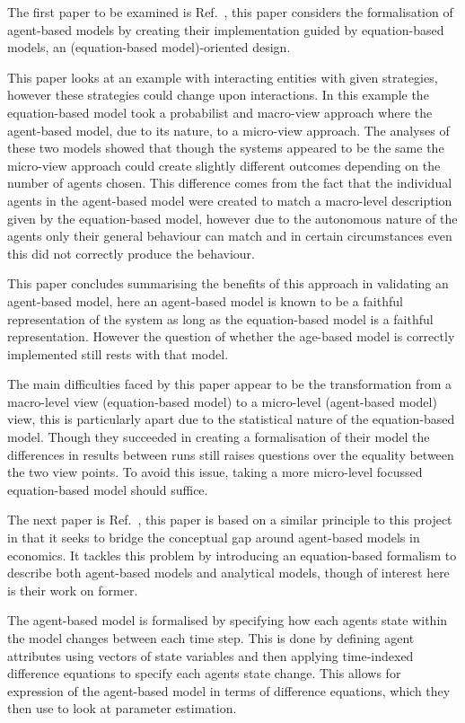 \documentclass{article}
\begin{document}
The first paper to be examined is Ref.~\cite{ebmabmi}, this paper considers the formalisation of agent-based models by creating their implementation guided by equation-based models, an (equation-based model)-oriented design.  

This paper looks at an example with interacting entities with given strategies, however these strategies could change upon interactions. In this example the equation-based model took a probabilist and macro-view approach where the agent-based model, due to its nature, to a micro-view approach. The analyses of these two models showed that though the systems appeared to be the same the micro-view approach could create slightly different outcomes depending on the number of agents chosen. This difference comes from the fact that the individual agents in the agent-based model were created to match a macro-level description given by the equation-based model, however due to the autonomous nature of the agents only their general behaviour can match and in certain circumstances even this did not correctly produce the behaviour.

This paper concludes summarising the benefits of this approach in validating an agent-based model, here an agent-based model is known to be a faithful representation of the system as long as the equation-based model is a faithful representation. However the question of whether the age-based model is correctly implemented still rests with that model. 

The main difficulties faced by this paper appear to be the transformation from a macro-level view (equation-based model) to a micro-level (agent-based model) view, this is particularly apart due to the statistical nature of the equation-based model. Though they succeeded in creating a formalisation of their model the differences in results between runs still raises questions over the equality between the two view points. To avoid this issue, taking a more micro-level focussed equation-based model should suffice.

The next paper is Ref.~\cite{econmistsnoabm}, this paper is based on a similar principle to this project in that it seeks to bridge the conceptual gap around  agent-based models in economics. It tackles this problem by introducing an equation-based formalism to describe both agent-based models and analytical models, though of interest here is their work on former. 

The agent-based model is formalised by specifying how each agent\textsc{}s state within the model changes between each time step. This is done by defining agent attributes using vectors of state variables and then applying time-indexed difference equations to specify each agents state change. This allows for expression of the agent-based model in terms of difference equations, which they then use to look at parameter estimation. 
\end{document}
